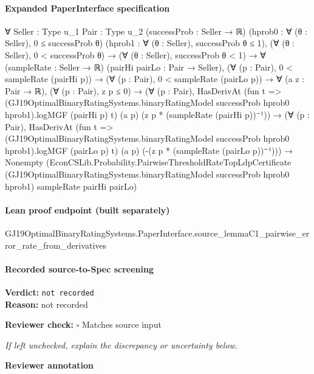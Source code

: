 \documentclass[10pt]{article}
\newcommand{\reviewerbox}{%
  \par\noindent\fbox{\parbox{0.96\linewidth}{\rule{0pt}{0.38in}}}\par
}
\newcommand{\reviewmatch}[1]{%
  \par\noindent\textbf{Reviewer check:} $\square$\; #1\par
  \noindent\emph{If left unchecked, explain the discrepancy or uncertainty below.}\par
}
\begin{document}
\paragraph{Expanded PaperInterface specification}
\begin{ReviewVerbatim}
∀ {Seller : Type u_1} {Pair : Type u_2} (successProb : Seller → ℝ) (hprob0 : ∀ (θ : Seller), 0 ≤ successProb θ)
  (hprob1 : ∀ (θ : Seller), successProb θ ≤ 1),
  (∀ (θ : Seller), 0 < successProb θ) →
    (∀ (θ : Seller), successProb θ < 1) →
      ∀ (sampleRate : Seller → ℝ) (pairHi pairLo : Pair → Seller),
        (∀ (p : Pair), 0 < sampleRate (pairHi p)) →
          (∀ (p : Pair), 0 < sampleRate (pairLo p)) →
            ∀ (a z : Pair → ℝ),
              (∀ (p : Pair), z p ≤ 0) →
                (∀ (p : Pair),
                    HasDerivAt
                      (fun t =>
                        (GJ19OptimalBinaryRatingSystems.binaryRatingModel successProb hprob0 hprob1).logMGF (pairHi p)
                          t)
                      (a p) (z p * (sampleRate (pairHi p))⁻¹)) →
                  (∀ (p : Pair),
                      HasDerivAt
                        (fun t =>
                          (GJ19OptimalBinaryRatingSystems.binaryRatingModel successProb hprob0 hprob1).logMGF (pairLo p)
                            t)
                        (a p) (-(z p * (sampleRate (pairLo p))⁻¹))) →
                    Nonempty
                      (EconCSLib.Probability.PairwiseThresholdRateTopLdpCertificate
                        (GJ19OptimalBinaryRatingSystems.binaryRatingModel successProb hprob0 hprob1) sampleRate pairHi
                        pairLo)
\end{ReviewVerbatim}

\paragraph{Lean proof endpoint (built separately)}\begin{ReviewVerbatim}
GJ19OptimalBinaryRatingSystems.PaperInterface.source_lemmaC1_pairwise_error_rate_from_derivatives
\end{ReviewVerbatim}

\paragraph{Recorded source-to-Spec screening}
\textbf{Verdict:} \texttt{not recorded}
\\
\textbf{Reason:} not recorded
\reviewmatch{Matches source input}
\noindent\textbf{Reviewer annotation}\par
\reviewerbox
\clearpage
\hypertarget{source-claim-5122f84bd17b3a2c}{}
\end{document}
